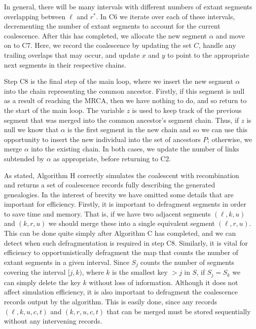 \documentclass[10pt,letterpaper]{article}
\newcommand{\algref}[1]{#1}
\begin{document}
In general, there will be many intervals with different numbers of extant
segments overlapping between $\ell$ and $r^\ast$. In \algref{C6} we
iterate over each of these intervals, decrementing the number of extant
segments to account for the current coalescence. After this has completed,
we allocate the new segment $\alpha$ and move on to \algref{C7}. Here,
we record the coalescence by updating the set $C$, handle
any trailing overlaps that may occur, and update $x$ and $y$ to point
to the appropriate next segments in their respective chains.

Step \algref{C8} is the final step of the main loop,
where we insert the new segment $\alpha$ into the
chain representing the common ancestor. Firstly, if this segment is null as a
result of reaching the MRCA, then we have nothing to do, and so return to the
start of the main loop. The variable $z$ is used to keep track of the
previous segment that was merged into the common ancestor's segment chain.
Thus, if $z$ is null we know that $\alpha$ is the first segment in the
new chain and so we can use this opportunity to insert the new
individual into the set of ancestors $P$; otherwise, we merge $\alpha$
into the existing chain. In both cases, we update the number of links
subtended by $\alpha$ as appropriate, before returning to \algref{C2}.

As stated, Algorithm H correctly simulates the coalescent with recombination
and returns a set of coalescence records fully describing the generated
genealogies. In the interest of brevity we have omitted some details
that are important for efficiency. Firstly, it is important to defragment
segments in order to save time and memory. That is, if we have two adjacent segments
$(\ell, k, u)$ and $(k, r, u)$ we should merge these into a single equivalent
segment $(\ell, r, u)$. This can be done quite simply after Algorithm C has
completed, and we can detect when such defragmentation is required in step
\algref{C8}. Similarly, it is vital for efficiency to opportunistically
defragment the map that counts the number of extant segments in a given
interval. Since $S_j$ counts the number of segments covering the interval $[j,
k)$, where $k$ is the smallest key $> j$ in $S$, if $S_j = S_k$ we can simply
delete the key $k$ without loss of information. Although it does not
affect simulation efficiency, it is also important to defragment the coalescence
records output by the algorithm. This is easily done, since any records
$(\ell, k, u, c, t)$ and $(k, r, u, c, t)$ that can be merged must be
stored sequentially without any intervening records.
\end{document}
